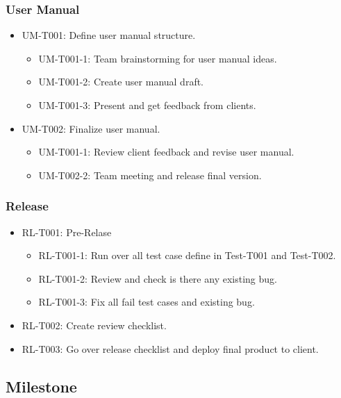 	\subsubsection{User Manual}
	\begin{itemize}
		\item UM-T001: Define user manual structure.
		\begin{itemize}
				\item UM-T001-1: Team brainstorming for user manual ideas.
				\item UM-T001-2: Create user manual draft.
				\item UM-T001-3: Present and get feedback from clients.
		\end{itemize}
		\item UM-T002: Finalize user manual. 
		\begin{itemize}
				\item UM-T001-1: Review client feedback and revise user manual.
				\item UM-T002-2: Team meeting and release final version.
		\end{itemize}
	\end{itemize}

	\subsubsection{Release}
	\begin{itemize}
		\item RL-T001: Pre-Relase
		\begin{itemize}
			\item RL-T001-1: Run over all test case define in Test-T001 and Test-T002.
			\item RL-T001-2: Review and check is there any existing bug.
			\item RL-T001-3: Fix all fail test cases and existing bug. 
		\end{itemize}
		\item RL-T002: Create review checklist.
		\item RL-T003: Go over release checklist and deploy final product to client.
	\end{itemize}
	
	
\subsection{Milestone}
